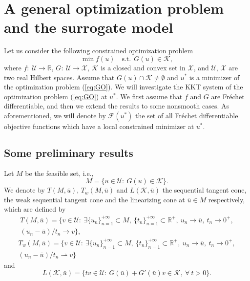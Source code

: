 \documentclass[leqno]{amsart}
\theoremstyle{definition}
\begin{document}
\section{A general optimization problem and the surrogate model}\label{sec:general}
\setcounter{equation}{0}
Let us consider the following constrained optimization problem
\begin{equation}\label{eq:GO}
\min f(u)\quad \mbox{s.t.}\ \ G(u) \in \mathcal{K}, 
\end{equation} 
where $f:\ \mathcal{U}\rightarrow \mathbb{R}$, $G:\ \mathcal{U}\rightarrow \mathcal{X}$, $\mathcal{K}$ is a closed and convex set in $\mathcal{X}$, and $\mathcal{U}$, $\mathcal{X}$ are two real Hilbert spaces. Assume that $G(u)\cap \mathcal{K}\neq \emptyset$ and $u^*$ is a minimizer of the optimization problem (\ref{eq:GO}). We will investigate the KKT system of the optimization problem (\ref{eq:GO}) at $u^*$. We first assume that $f$ and $G$ are Fr\'{e}chet differentiable, and then we extend the results to some nonsmooth cases. As aforementioned, we will denote by $\mathcal{F}(u^*)$ the set of all Fr\'{e}chet differentiable objective functions which have a local constrained minimizer at $u^*$.

\subsection{Some preliminary results}
Let $M$ be the feasible set, i.e.,
\begin{equation}\label{eq:FS}
M = \{u\in\mathcal{U}:\ G(u)\in\mathcal{K} \}.
\end{equation} 
We  denote by $T(M, \bar{u})$, $T_w(M, \bar{u})$ and $L(\mathcal{K}, \bar{u})$ the sequential tangent cone,  the weak sequential tangent cone and the linearizing cone at $\bar{u}\in M$ respectively, which are defined by 
\begin{multline}\nonumber
T(M, \bar{u}) = \big\{v\in \mathcal{U}:\ \exists \{u_n\}_{n=1}^{+\infty}\subset M,\ \{t_n\}_{n=1}^{+\infty}\subset \mathbb{R}^+,\ u_n \rightarrow \bar{u}, \ t_n\rightarrow 0^+,\\
  (u_n - \bar{u})/t_n\rightarrow v\big\},
\end{multline}
\begin{multline}\nonumber
T_w(M, \bar{u}) = \big\{v\in \mathcal{U}:\ \exists \{u_n\}_{n=1}^{+\infty}\subset M,\ \{t_n\}_{n=1}^{+\infty}\subset \mathbb{R}^+,\ u_n \rightarrow \bar{u}, \ t_n\rightarrow 0^+, \\
(u_n - \bar{u})/t_n\rightharpoonup v\big\}
\end{multline}
and 
\begin{equation}\label{eq:LC}
L(\mathcal{K}, \bar{u}) = \{tv\in \mathcal{U}:\  G(\bar{u}) + G'(\bar{u})v\in \mathcal{K},\ \forall\ t > 0\}. 
\end{equation}
\end{document}
